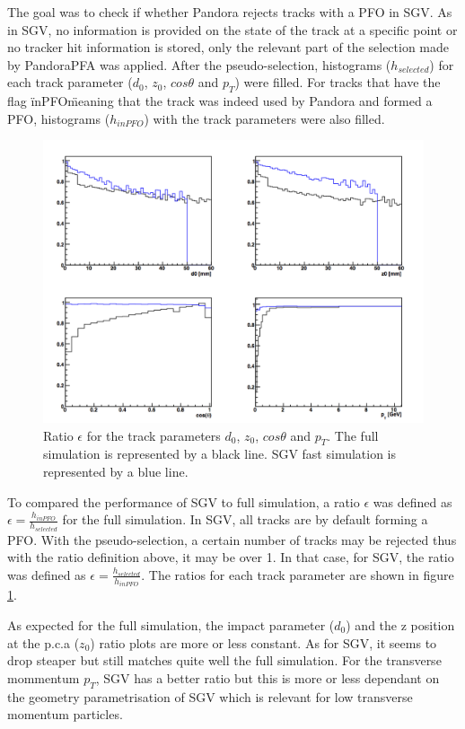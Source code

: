 The goal was to check if whether Pandora rejects tracks with a PFO in SGV. As in SGV, no information is provided on the state of the track at a specific point or no tracker hit information is stored, only the relevant part of the selection made by PandoraPFA was applied. After the pseudo-selection, histograms ($h_{selected}$) for each track parameter ($d_0$, $z_0$, $cos\theta$ and $p_T$) were filled. For tracks that have the flag \"inPFO\" meaning that the track was indeed used by Pandora and formed a PFO, histograms ($h_{inPFO}$) with the track parameters were also filled.

\begin{figure}[t]
  \centering
  \includegraphics[width=1\linewidth]{chap6/fig_SGV/eff_track_selection_curlers.png}
  \caption{Ratio $\epsilon$ for the track parameters $d_0$, $z_0$, $cos\theta$ and $p_T$. The full simulation is represented by a black line. SGV fast simulation is represented by a blue line.}
  \label{fig:trk_select_wcurlers}
\end{figure}

To compared the performance of SGV to full simulation, a ratio $\epsilon$ was defined as $\epsilon = \frac{h_{inPFO}}{h_{selected}}$ for the full simulation. In SGV, all tracks are by default forming a PFO. With the pseudo-selection, a certain number of tracks may be rejected thus with the ratio definition above, it may be over 1. In that case, for SGV, the ratio was defined as $\epsilon = \frac{h_{selected}}{h_{inPFO}}$. The ratios for each track parameter are shown in figure \ref{fig:trk_select_wcurlers}.

As expected for the full simulation, the impact parameter ($d_0$) and the z position at the p.c.a ($z_0$) ratio plots are more or less constant. As for SGV, it seems to drop steaper but still matches quite well the full simulation. For the transverse mommentum $p_{T}$, SGV has a better ratio but this is more or less dependant on the geometry parametrisation of SGV which is relevant for low transverse momentum particles.

